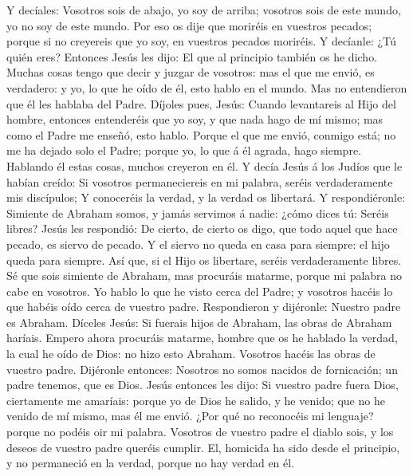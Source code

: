  Y decíales: Vosotros sois de abajo, yo soy de arriba;
vosotros sois de este mundo, yo no soy de este mundo.  Por
eso os dije que moriréis en vuestros pecados; porque si no creyereis que
yo soy, en vuestros pecados moriréis.  Y decíanle: ¿Tú
quién eres? Entonces Jesús les dijo: El que al principio también os he
dicho.  Muchas cosas tengo que decir y juzgar de vosotros:
mas el que me envió, es verdadero: y yo, lo que he oído de él, esto
hablo en el mundo.  Mas no entendieron que él les hablaba
del Padre.  Díjoles pues, Jesús: Cuando levantareis al Hijo
del hombre, entonces entenderéis que yo soy, y que nada hago de mí
mismo; mas como el Padre me enseñó, esto hablo.  Porque el
que me envió, conmigo está; no me ha dejado solo el Padre; porque yo, lo
que á él agrada, hago siempre.  Hablando él estas cosas,
muchos creyeron en él.  Y decía Jesús á los Judíos que le
habían creído: Si vosotros permaneciereis en mi palabra, seréis
verdaderamente mis discípulos;  Y conoceréis la verdad, y
la verdad os libertará.  Y respondiéronle: Simiente de
Abraham somos, y jamás servimos á nadie: ¿cómo dices tú: Seréis libres?
 Jesús les respondió: De cierto, de cierto os digo, que
todo aquel que hace pecado, es siervo de pecado.  Y el
siervo no queda en casa para siempre: el hijo queda para siempre.
 Así que, si el Hijo os libertare, seréis verdaderamente
libres.  Sé que sois simiente de Abraham, mas procuráis
matarme, porque mi palabra no cabe en vosotros.  Yo hablo
lo que he visto cerca del Padre; y vosotros hacéis lo que habéis oído
cerca de vuestro padre.  Respondieron y dijéronle: Nuestro
padre es Abraham. Díceles Jesús: Si fuerais hijos de Abraham, las obras
de Abraham haríais.  Empero ahora procuráis matarme, hombre
que os he hablado la verdad, la cual he oído de Dios: no hizo esto
Abraham.  Vosotros hacéis las obras de vuestro padre.
Dijéronle entonces: Nosotros no somos nacidos de fornicación; un padre
tenemos, que es Dios.  Jesús entonces les dijo: Si vuestro
padre fuera Dios, ciertamente me amaríais: porque yo de Dios he salido,
y he venido; que no he venido de mí mismo, mas él me envió.
 ¿Por qué no reconocéis mi lenguaje? porque no podéis oir
mi palabra.  Vosotros de vuestro padre el diablo sois, y
los deseos de vuestro padre queréis cumplir. El, homicida ha sido desde
el principio, y no permaneció en la verdad, porque no hay verdad en él.
